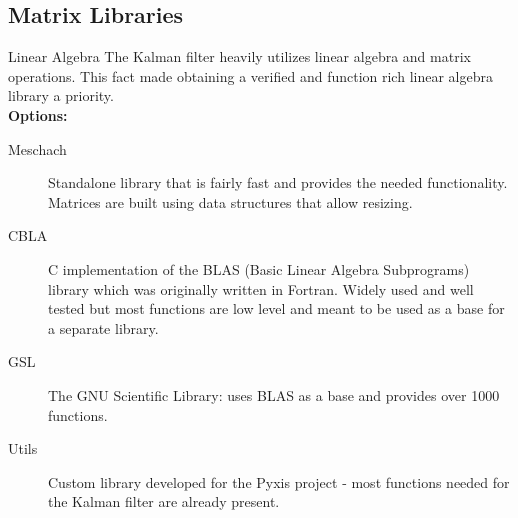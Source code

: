 \documentclass[10pt,aspectratio=169]{beamer}
\begin{document}
\subsection{Matrix Libraries}
    \begin{frame}[t]{Linear Algebra}
        The Kalman filter heavily utilizes linear algebra and matrix operations. This fact made obtaining a verified and function rich linear algebra library a priority.\\
        \vspace{0.5em}
        \textbf{Options:}
        \begin{description}
            \item[Meschach] Standalone library that is fairly fast and provides the needed functionality. Matrices are built using data structures that allow resizing.
            \item[CBLA] C implementation of the BLAS (Basic Linear Algebra Subprograms) library which was originally written in Fortran. Widely used and well tested but most functions are low level and meant to be used as a base for a separate library.
            \item[GSL] The GNU Scientific Library: uses BLAS as a base and provides over 1000 functions.
            \item[Utils] \alert{Custom library developed for the Pyxis project - most functions needed for the Kalman filter are already present.}
        \end{description}

    \end{frame}
\end{document}
